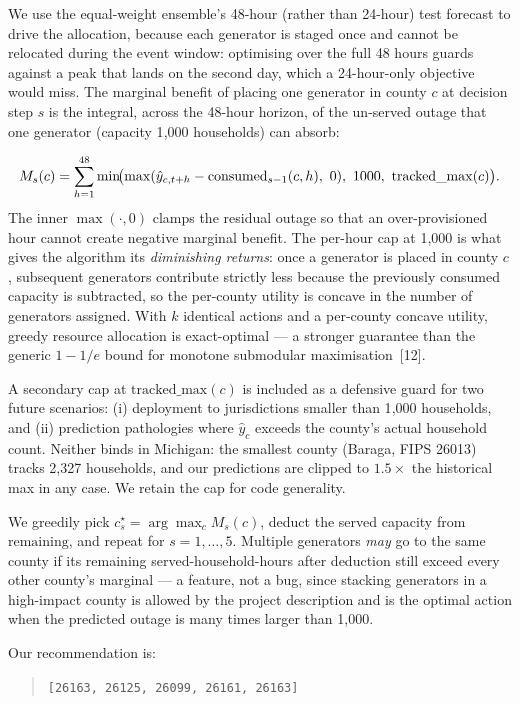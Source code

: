We use the equal-weight ensemble's 48-hour (rather than 24-hour) test forecast to drive the allocation, because each generator is staged once and cannot be relocated during the event window: optimising over the full 48 hours guards against a peak that lands on the second day, which a 24-hour-only objective would miss. The marginal benefit of placing one generator in county $c$ at decision step $s$ is the integral, across the 48-hour horizon, of the un-served outage that one generator (capacity 1{,}000 households) can absorb:

\[
M_s(c) = \sum_{h=1}^{48} \min\!\bigl( \max(\hat y_{c,t+h} - {\rm consumed}_{s-1}(c,h),\ 0),\ 1000,\ {\rm tracked\_max}(c) \bigr).
\]
The inner $\max(\cdot,0)$ clamps the residual outage so that an over-provisioned hour cannot create negative marginal benefit. The per-hour cap at 1{,}000 is what gives the algorithm its \emph{diminishing returns}: once a generator is placed in county $c$, subsequent generators contribute strictly less because the previously consumed capacity is subtracted, so the per-county utility is concave in the number of generators assigned. With $k$ identical actions and a per-county concave utility, greedy resource allocation is exact-optimal --- a stronger guarantee than the generic $1{-}1/e$ bound for monotone submodular maximisation~[12].

A secondary cap at $\text{tracked\_max}(c)$ is included as a defensive guard for two future scenarios: (i) deployment to jurisdictions smaller than 1{,}000 households, and (ii) prediction pathologies where $\hat y_c$ exceeds the county's actual household count. Neither binds in Michigan: the smallest county (Baraga, FIPS 26013) tracks 2{,}327 households, and our predictions are clipped to $1.5\times$ the historical max in any case. We retain the cap for code generality.

We greedily pick $c^\star_s = \arg\max_c M_s(c)$, deduct the served capacity from $\text{remaining}$, and repeat for $s{=}1,\dots,5$. Multiple generators \emph{may} go to the same county if its remaining served-household-hours after deduction still exceed every other county's marginal --- a feature, not a bug, since stacking generators in a high-impact county is allowed by the project description and is the optimal action when the predicted outage is many times larger than 1{,}000.

Our recommendation is:

\begin{quote}
\centering
\verb|[26163, 26125, 26099, 26161, 26163]|
\end{quote}

